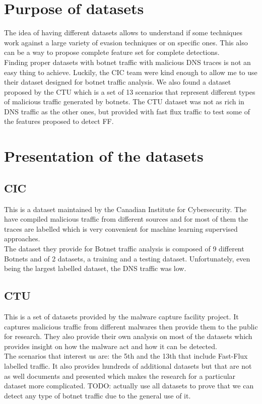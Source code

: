 \section{Purpose of datasets}
The idea of having different datasets allows to understand if some techniques work against a large variety of evasion techniques or on specific ones. This also can be a way to propose complete feature set for complete detections.
\\
Finding proper datasets with botnet traffic with malicious DNS traces is not an easy thing to achieve. Luckily, the CIC team were kind enough to allow me to use their dataset designed for botnet traffic analysis. We also found a dataset proposed by the CTU which is a set of 13 scenarios that represent different types of malicious traffic generated by botnets. The CTU dataset was not as rich in DNS traffic as the other ones, but provided with fast flux traffic to test some of the features proposed to detect FF.

\section{Presentation of the datasets}
\subsection{CIC}
This is a dataset maintained by the Canadian Institute for Cybersecurity. The have compiled malicious traffic from different sources and for most of them the traces are labelled which is very convenient for machine learning supervised approaches.\\ 
The dataset they provide for Botnet traffic analysis is composed of 9 different Botnets and of 2 datasets, a training and a testing dataset. Unfortunately, even being the largest labelled  dataset, the DNS traffic was low. 
\subsection{CTU}
This is a set of datasets provided by the malware capture facility project\cite{CTU}. It captures malicious traffic from different malwares then provide them to the public for research. They also provide their own analysis on most of the datasets which provides insight on how the malware act and how it can be detected.\\
The scenarios that interest us are: the 5th and the 13th that include Fast-Flux labelled traffic.
It also provides hundreds of additional datasets but that are not as well documents and presented which makes the research for a particular dataset more complicated.
TODO: actually use all datasets to prove that we can detect any type of botnet traffic due to the general use of it.
